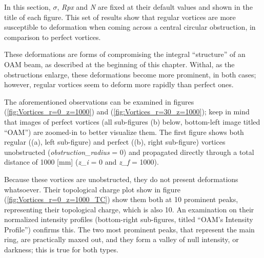 In this section, $\sigma$, \textit{Rpx} and \textit{N} are fixed at their default values and shown in the title of each figure. This set of results show that regular vortices are more susceptible to deformation when coming across a central circular obstruction, in comparison to perfect vortices.

These deformations are forms of compromising the integral ``structure'' of an OAM beam, as described at the beginning of this chapter. Withal, as the obstructions enlarge, these deformations become more prominent, in both cases; however, regular vortices seem to deform more rapidly than perfect ones. 

The aforementioned observations can be examined in figures (\ref{fig:Vortices_r=0_z=1000}) and (\ref{fig:Vortices_r=30_z=1000}); keep in mind that images of perfect vortices (all sub-figures (b) below, bottom-left image titled ``OAM'') are zoomed-in to better visualize them. The first figure shows both regular ((a), left sub-figure) and perfect ((b), right sub-figure) vortices unobstructed (\textit{obstruction\_radius} = 0) and propagated directly through a total distance of 1000 [mm] (\textit{z\_i} = 0 and \textit{z\_f} = 1000). 

Because these vortices are unobstructed, they do not present deformations whatsoever. Their topological charge plot show in figure (\ref{fig:Vortices_r=0_z=1000_TC}) show them both at 10 prominent peaks, representing their topological charge, which is also 10. An examination on their normalized intensity profiles (bottom-right sub-figures, titled ``OAM's Intensity Profile'') confirms this. The two most prominent peaks, that represent the main ring, are practically maxed out, and they form a valley of null intensity, or darkness; this is true for both types.

